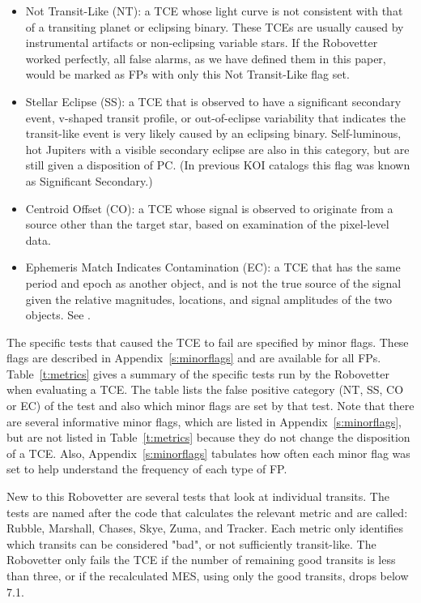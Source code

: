 \begin{itemize}
  \item Not Transit-Like (NT): a TCE whose light curve is not consistent with that of a transiting planet or eclipsing binary. These TCEs are usually caused by instrumental artifacts or non-eclipsing variable stars. If the Robovetter worked perfectly, all false alarms, as we have defined them in this paper, would be marked as FPs with only this Not Transit-Like flag set. 
  \item  Stellar Eclipse (SS): a TCE that is observed to have a significant secondary event, v-shaped transit profile, or out-of-eclipse variability that indicates the transit-like event is very likely caused by an eclipsing binary. Self-luminous, hot Jupiters with a visible secondary eclipse are also in this category, but are still given a disposition of PC. (In previous KOI catalogs this flag was known as Significant Secondary.)
  \item Centroid Offset (CO): a TCE whose signal is observed to originate from a source other than the target star, based on examination of the pixel-level data.
  \item Ephemeris Match Indicates Contamination (EC): a TCE that has the same period and epoch as another object, and is not the true source of the signal given the relative magnitudes, locations, and signal amplitudes of the two objects. See \citet{Coughlin2014}.
\end{itemize}

The specific tests that caused the TCE to fail are specified by minor flags. These flags are described in Appendix~\ref{s:minorflags} and are available for all FPs.  Table~\ref{t:metrics} gives a summary of the specific tests run by the Robovetter when evaluating a TCE.  The table lists the false positive category (NT, SS, CO or EC) of the test and also which minor flags are set by that test.  Note that there are several informative minor flags, which are listed in Appendix~\ref{s:minorflags}, but are not listed in Table~\ref{t:metrics} because they do not change the disposition of a TCE. Also, Appendix~\ref{s:minorflags} tabulates how often each minor flag was set to help understand the frequency of each type of FP. 

New to this Robovetter are several tests that look at individual transits. The tests are named after the code that calculates the relevant metric and are called: Rubble, Marshall, Chases, Skye, Zuma, and Tracker.  Each metric only identifies which transits can be considered "bad", or not sufficiently transit-like.  The Robovetter only fails the TCE if the number of remaining good transits is less than three, or if the recalculated MES, using only the good transits, drops below 7.1.

